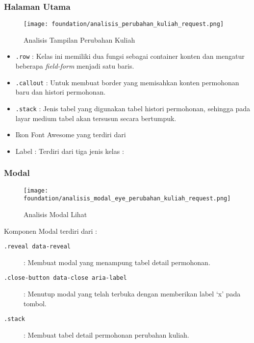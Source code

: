 \subsubsection{Halaman Utama}
\begin{figure} [H]
\centering  
\texttt{[image: foundation/analisis\_perubahan\_kuliah\_request.png]}
\caption{Analisis Tampilan Perubahan Kuliah}
\end{figure}
\begin{itemize}
	\item \texttt{.row} : Kelas ini memiliki dua fungsi sebagai container konten dan mengatur beberapa \textit{field-form} menjadi satu baris. 
	\item \texttt{.callout} : Untuk membuat border yang memisahkan konten permohonan baru dan histori permohonan.
	\item \texttt{.stack} : Jenis tabel yang digunakan tabel histori permohonan, sehingga pada layar medium tabel akan tersusun secara bertumpuk.
	\item Ikon Font Awesome yang terdiri dari 
	\item Label : Terdiri dari tiga jenis kelas :
	
\end{itemize}
\subsubsection{Modal}
\begin{figure} [H]
\centering  
\texttt{[image: foundation/analisis\_modal\_eye\_perubahan\_kuliah\_request.png]}
\caption{Analisis Modal Lihat}
\end{figure}
Komponen Modal terdiri dari :
\begin{description}
	\item [\texttt{.reveal data-reveal}] : Membuat modal yang menampung tabel detail permohonan.
	\item [\texttt{.close-button data-close aria-label}] : Menutup modal yang telah terbuka dengan memberikan label `x' pada tombol.
	\item [\texttt{.stack}] :	Membuat tabel detail permohonan perubahan kuliah.
\end{description}


